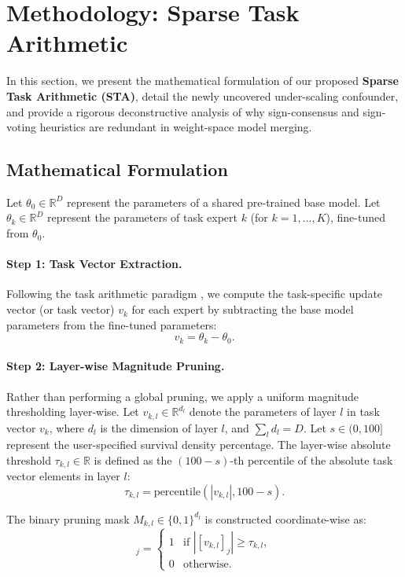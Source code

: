 \section{Methodology: Sparse Task Arithmetic}
\label{sec:method}

In this section, we present the mathematical formulation of our proposed \textbf{Sparse Task Arithmetic (STA)}, detail the newly uncovered under-scaling confounder, and provide a rigorous deconstructive analysis of why sign-consensus and sign-voting heuristics are redundant in weight-space model merging.

\subsection{Mathematical Formulation}
Let $\theta_0 \in \mathbb{R}^D$ represent the parameters of a shared pre-trained base model. Let $\theta_k \in \mathbb{R}^D$ represent the parameters of task expert $k$ (for $k = 1, \dots, K$), fine-tuned from $\theta_0$.

\paragraph{Step 1: Task Vector Extraction.}
Following the task arithmetic paradigm \cite{Ilharco2022}, we compute the task-specific update vector (or task vector) $v_k$ for each expert by subtracting the base model parameters from the fine-tuned parameters:
\begin{equation}
    v_k = \theta_k - \theta_0.
\end{equation}

\paragraph{Step 2: Layer-wise Magnitude Pruning.}
Rather than performing a global pruning, we apply a uniform magnitude thresholding layer-wise. Let $v_{k, l} \in \mathbb{R}^{d_l}$ denote the parameters of layer $l$ in task vector $v_k$, where $d_l$ is the dimension of layer $l$, and $\sum_l d_l = D$. 
Let $s \in (0, 100]$ represent the user-specified survival density percentage. The layer-wise absolute threshold $\tau_{k, l} \in \mathbb{R}$ is defined as the $(100 - s)$-th percentile of the absolute task vector elements in layer $l$:
\begin{equation}
    \tau_{k, l} = \text{percentile}\left(|v_{k, l}|, 100 - s\right).
\end{equation}

The binary pruning mask $M_{k, l} \in \{0, 1\}^{d_l}$ is constructed coordinate-wise as:
\begin{equation}
    [M_{k, l}]_j = \begin{cases} 
        1 & \text{if } |[v_{k, l}]_j| \ge \tau_{k, l}, \\ 
        0 & \text{otherwise}.
    \end{cases}
\end{equation}

